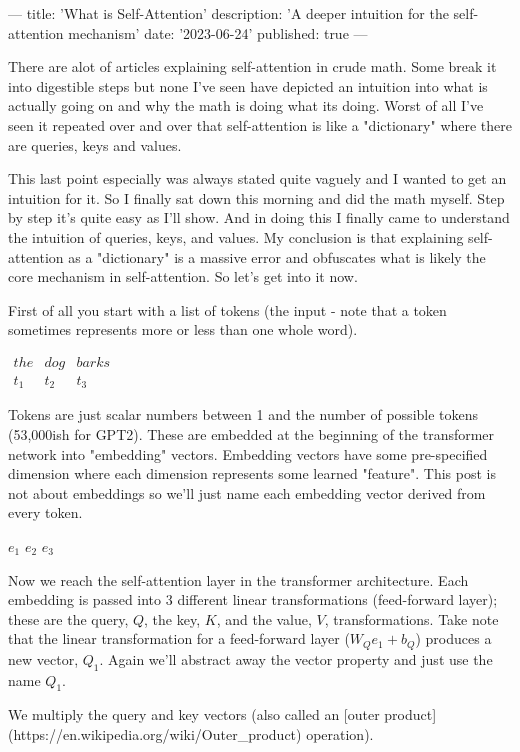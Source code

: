 ---
title: 'What is Self-Attention'
description: 'A deeper intuition for the self-attention mechanism'
date: '2023-06-24'
published: true
---

There are alot of articles explaining self-attention in crude math. Some break it into digestible steps but none I've seen have depicted an intuition into what is actually going on and why the math is doing what its doing. Worst of all I've seen it repeated over and over that self-attention is like a "dictionary" where there are queries, keys and values.

This last point especially was always stated quite vaguely and I wanted to get an intuition for it. So I finally sat down this morning and did the math myself. Step by step it's quite easy as I'll show. And in doing this I finally came to understand the intuition of queries, keys, and values. My conclusion is that explaining self-attention as a "dictionary" is a massive error and obfuscates what is likely the core mechanism in self-attention. So let's get into it now.

First of all you start with a list of tokens (the input - note that a token sometimes represents more or less than one whole word).

$
\begin{array}{ccc}
    the & dog & barks \\
    t_1 & t_2 & t_3
\end{array}
$

Tokens are just scalar numbers between 1 and the number of possible tokens (53,000ish for GPT2). These are embedded at the beginning of the transformer network into "embedding" vectors. Embedding vectors have some pre-specified dimension where each dimension represents some learned "feature". This post is not about embeddings so we'll just name each embedding vector derived from every token.

$e_1$ $e_2$ $e_3$

Now we reach the self-attention layer in the transformer architecture. Each embedding is passed into 3 different linear transformations (feed-forward layer); these are the query, $Q$, the key, $K$, and the value, $V$, transformations. Take note that the linear transformation for a feed-forward layer ($W_Q e_1 + b_Q$) produces a new vector, $Q_1$. Again we'll abstract away the vector property and just use the name $Q_1$.

We multiply the query and key vectors (also called an [outer product](https://en.wikipedia.org/wiki/Outer_product) operation).

